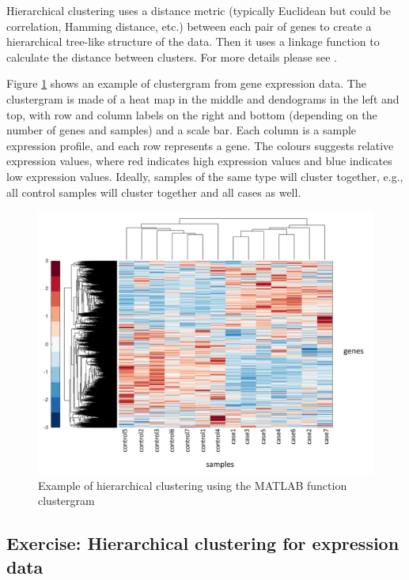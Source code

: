 \documentclass[11pt, oneside]{article}   	%
\begin{document}
Hierarchical clustering uses a distance metric (typically Euclidean but could be correlation, Hamming distance, etc.) between each pair of genes to create a hierarchical tree-like structure of the data. Then it uses a linkage function to calculate the distance between clusters. For more details please see \cite{Clustergram}. 


Figure \ref{fig:hierarchical-clustering} shows an example of clustergram from gene expression data.
The clustergram is made of a heat map in the middle and dendograms in the left and top, with row and column labels on the right and bottom (depending on the number of genes and samples) and a scale bar. 
Each column is a sample expression profile, and each row represents a gene.
The colours suggests relative expression values, where red indicates high expression values and blue indicates low expression values. 
Ideally, samples of the same type will cluster together, e.g., all control samples will cluster together and all cases as well.

\begin{figure}[!h]
	\includegraphics[width=\textwidth]{hierarchical-clustering}
	\caption{Example of hierarchical clustering using the MATLAB function clustergram}
	\label{fig:hierarchical-clustering}
\end{figure}


\subsection{Exercise: Hierarchical clustering for expression data}
\end{document}
